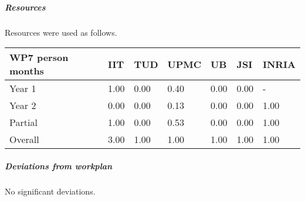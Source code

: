 

\subparagraph{Resources}

Resources were used as follows.

\begin{center}
\begin{tabular}{|C{1.5cm}|C{1.5cm}|C{1.5cm}|C{2cm}|C{2cm}|C{2cm}|C{2cm}|}
\hline
\footnotesize \textbf{WP7 person months}& \footnotesize \textbf{IIT}&\footnotesize \textbf{TUD}&\footnotesize \textbf{UPMC}& \footnotesize \textbf{UB} &\footnotesize \textbf{JSI} & \footnotesize \textbf{INRIA} \\ \hline
\footnotesize Year 1 &  1.00 & 0.00 & 0.40 & 0.00 & 0.00 & - \\  \hline
\footnotesize Year 2 &  0.00 & 0.00 & 0.13 & 0.00 & 0.00 & 1.00 \\  \hline
\footnotesize Partial & 1.00 & 0.00 & 0.53 & 0.00 & 0.00 & 1.00 \\ \hline \hline
\footnotesize Overall & 3.00 & 1.00 & 1.00 & 1.00 & 1.00 & 1.00 \\ \hline
\end{tabular}
\end{center}

\subparagraph{Deviations from workplan} 
No significant deviations. 